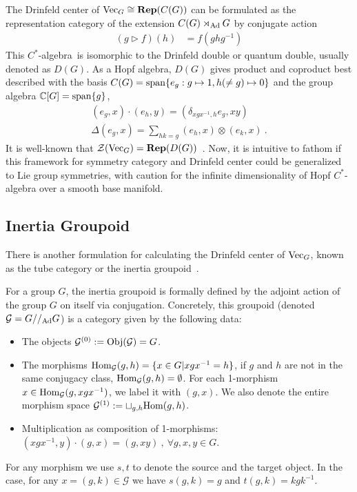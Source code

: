 \documentclass[a4paper,11pt]{article}
\newcommand{\Rep}{\textbf{Rep}}
\newcommand{\be}{\begin{equation}}
\newcommand{\ee}{\end{equation}}
\newcommand{\ba}{\begin{aligned}}
\newcommand{\ea}{\end{aligned}}
\def\bbC{\mathbb{C}}
\def\CG{\mathcal{G}}
\def\CZ{\mathcal{Z}}
\def\calg{$C^*$-algebra\ }
\def\vecg{{\rm Vec}_G}
\begin{document}
The Drinfeld center of $\vecg \cong \Rep(C(G))$ can be formulated as the representation category of the extension $C(G)\rtimes_{\rm Ad} G$ by conjugate action 
\be\ba
(g\rhd f) (h) &= f(ghg^{-1})
\ea\ee
This \calg is isomorphic to the Drinfeld double or quantum double, usually denoted as $D(G)$. As a Hopf algebra, $D(G)$ gives product and coproduct best described with the basis $C(G) = {\rm span}\{e_g: g\mapsto 1 ,h(\ne g)\mapsto 0\}$ and the group algebra $\bbC[G] = {\rm span}\{g \}$,
\be\ba
(e_g,x) \cdot (e_h,y) = (\delta_{xgx^{-1},h} e_g ,xy)\\
\Delta(e_g,x) = \sum_{hk = g} (e_h,x) \otimes (e_k,x) \ .
\ea\ee
It is well-known that $\CZ(\vecg) = \Rep(D(G))$~\cite{Etingof:2024abc}. 
Now, it is intuitive to fathom if this framework for symmetry category and Drinfeld center could be generalized to Lie group symmetries, with caution for the infinite dimensionality of Hopf $C^*$-algebra over a smooth base manifold.

\subsection{Inertia Groupoid}
There is another formulation for calculating the Drinfeld center of $\vecg$, known as the tube category or the inertia groupoid~\cite{KAWASAKI197875,Lupercio:2004bro}.

For a group $G$, the inertia groupoid is formally defined by the adjoint action of the group $G$ on itself via conjugation. Concretely, this groupoid (denoted $\CG = G//_{\rm Ad}G$) is a category given by the following data:
    \begin{itemize}
        \item The objects $\CG^{(0)} := {\rm Obj}(\CG)= G$.
        \item The morphisms ${\rm Hom}_{\CG}(g,h) = \{ x\in G| xgx^{-1} = h \}$, if $g$ and $h$ are not in the same conjugacy class, ${\rm Hom}_{\CG}(g,h) = \emptyset$. For each 1-morphism $x\in {\rm Hom}_\CG (g,xgx^{-1})$, we label it with $(g,x)$. We also denote the entire morphism space $\CG^{(1)}:= \sqcup_{g,h} {\rm Hom}(g,h)$.
        
        \item Multiplication as composition of 1-morphisms: $(xgx^{-1},y)\cdot (g,x) = (g,xy) \ , \ \forall g,x,y\in G$.
    \end{itemize}
For any morphism we use $s,t$ to denote the source and the target object. In the case, for any $x = (g,k)\in \CG$ we have $s(g,k) = g$ and $t(g,k) = kgk^{-1}$.
\end{document}
